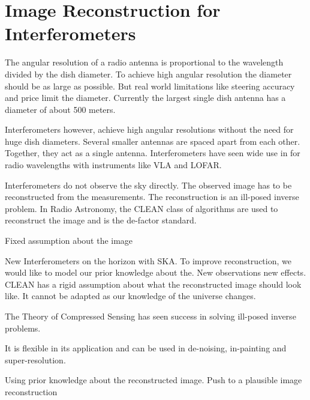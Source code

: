 \section{Image Reconstruction for Interferometers}\label{intro}
The angular resolution of a radio antenna is proportional to the wavelength divided by the dish diameter. To achieve high angular resolution the diameter should be as large as possible. But real world limitations like steering accuracy and price limit the diameter. Currently the largest single dish antenna has a diameter of about 500 meters\cite{chinaFAST}. 
  
Interferometers however, achieve high angular resolutions without the need for huge dish diameters. Several smaller antennas are spaced apart from each other. Together, they act as a single antenna. Interferometers have seen wide use in for radio wavelengths with instruments like VLA and LOFAR.

Interferometers do not observe the sky directly. The observed image has to be reconstructed from the measurements. The reconstruction is an ill-posed inverse problem. In Radio Astronomy, the CLEAN class of algorithms\cite{hogbom1974aperture}\cite{schwab1984relaxing}\cite{rich2008multi}\cite{rau2011multi} are used to reconstruct the image and is the de-factor standard. 

Fixed assumption about the image

New Interferometers on the horizon with SKA. To improve reconstruction, we would like to model our prior knowledge about the. New observations new effects. CLEAN has a rigid assumption about what the reconstructed image should look like. It cannot be adapted as our knowledge of the universe changes.

The Theory of Compressed Sensing\cite{candes2006robust}\cite{donoho2006compressed} has seen success in solving ill-posed inverse problems. 

It is flexible in its application and can be used in de-noising\cite{many}, in-painting\cite{many} and super-resolution\cite{many}.

Using prior knowledge about the reconstructed image. 
Push to a plausible image reconstruction



